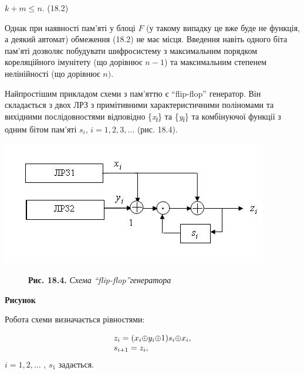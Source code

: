 \bigskip

{\centering
  $k+m\le n$.  (18.2)
\par}


\bigskip

 Однак при наявності пам’яті у блоці  $F$ (у такому випадку це вже буде не
функція, а деякий автомат) обмеження (18.2) не має місця. Введення навіть
одного біта пам’яті дозволяє побудувати шифросистему з максимальним порядком
кореляційного імунітету (що дорівнює  $n-1$) та максимальним степенем
нелінійності (що дорівнює  $n)\text{.}$

Найпростішим прикладом схеми з пам’яттю є “flip{}-flop” генератор. Він
складається з двох ЛРЗ з примітивними характеристичними поліномами та вихідними
послідовностями відповідно \{\textit{x}\textit{\textsubscript{і}}\} та
\{\textit{y}\textit{\textsubscript{і}}\} та комбінуючої функції з одним бітом
пам’яті  $s_i$,  $i=1,2,3,\dots$ (рис. 18.4). 

{\centering 
\includegraphics[width=4.5835in,height=2.1354in]{crypt-img/crypt-img340.jpg}
\par}

\begin{figure}
\centering
\begin{minipage}{3.1874in}
\textbf{Рис. 18.4. }\textit{Схема }\textit{“flip-flop”}\textit{генератора}
\end{minipage}
\end{figure}
{\centering\bfseries
Рисунок \stepcounter{}{\the}
\par}


\bigskip

Робота схеми визначається рівностями:

\begin{equation*}
\begin{matrix}{z_{i}=(x_{i}{\oplus}y_{i}{\oplus}1)s_{i}{\oplus}x_{i},}\hfill\null
\\s_{i+1}=z_{i},\hfill\null \end{matrix}\hfill 
\end{equation*}
 $i=1,2,\dots$ ,   $s_1$ задається.

